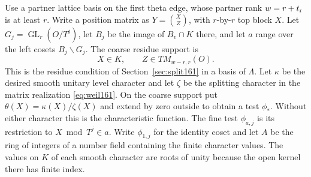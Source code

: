 \documentclass[a4paper,11pt]{article}
\theoremstyle{definition}
\theoremstyle{remark}
\numberwithin{equation}{section}
\newcommand{\GL}{\operatorname{GL}}
\begin{document}
Use a partner lattice basis on the first theta edge, whose
partner rank \(w=r+t_{\rm r}\) is at least \(r\). Write a
position matrix as \(Y=\binom{X}{Z}\), with \(r\)-by-\(r\)
top block \(X\). Let \(G_j=\GL_r(O/T^j)\), let \(B_j\) be the
image of \(B_v\cap K\) there, and let \(a\) range over the left
cosets \(B_j\backslash G_j\). The coarse residue support is
\[
          X\in K,\qquad Z\in T M_{w-r,r}(O).
\]
This is the residue condition of Section~\ref{sec:split161} in
a basis of \(\Lambda\). Let \(\kappa\) be the desired smooth
unitary level character and let \(\zeta\) be the splitting
character in the matrix realization \eqref{eq:weil161}.
On the coarse support put \(\theta(X)=\kappa(X)/\zeta(X)\)
and extend by zero outside to obtain a test \(\phi_*\).
Without either character this is the characteristic function.
The fine test \(\phi_{a,j}\) is its restriction to
\(X\bmod T^j\in a\). Write \(\phi_{1,j}\) for the identity
coset and let \(A\) be the ring of integers of a number field
containing the finite character values. The values on
\(K\) of each smooth character are roots of unity because
the open kernel there has finite index.
\end{document}
